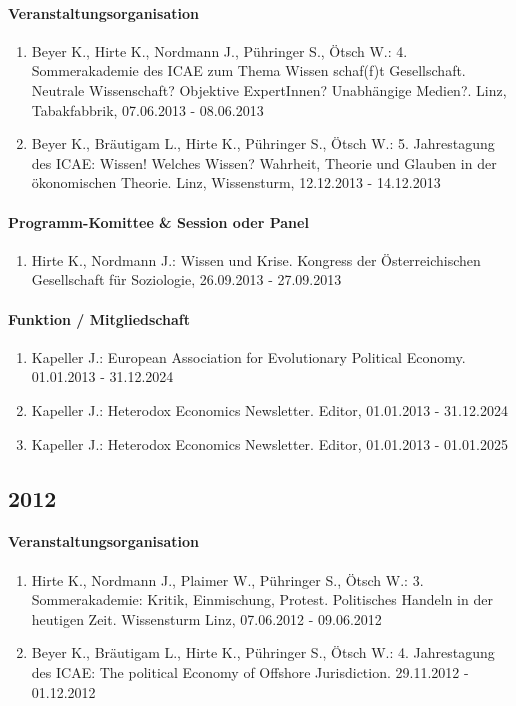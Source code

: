 \paragraph{Veranstaltungsorganisation}
\begin{enumerate}[leftmargin=*, labelsep=0.5cm]
\item Beyer K., Hirte K., Nordmann J., Pühringer S., Ötsch W.: 4. Sommerakademie des ICAE zum Thema  	  Wissen schaf(f)t Gesellschaft. Neutrale Wissenschaft? Objektive ExpertInnen? Unabhängige Medien?. Linz, Tabakfabbrik, 07.06.2013 - 08.06.2013
\item Beyer K., Bräutigam L., Hirte K., Pühringer S., Ötsch W.: 5. Jahrestagung des ICAE: Wissen! Welches Wissen? Wahrheit, Theorie und Glauben in der ökonomischen Theorie. Linz, Wissensturm, 12.12.2013 - 14.12.2013
\end{enumerate}

\paragraph{Programm-Komittee \& Session oder Panel}
\begin{enumerate}[leftmargin=*, labelsep=0.5cm]
\item Hirte K., Nordmann J.: Wissen und Krise. Kongress der Österreichischen Gesellschaft für Soziologie, 26.09.2013 - 27.09.2013
\end{enumerate}

\paragraph{Funktion / Mitgliedschaft}
\begin{enumerate}[leftmargin=*, labelsep=0.5cm]
\item Kapeller J.: European Association for Evolutionary Political Economy. 01.01.2013 - 31.12.2024
\item Kapeller J.: Heterodox Economics Newsletter. Editor, 01.01.2013 - 31.12.2024
\item Kapeller J.: Heterodox Economics Newsletter. Editor, 01.01.2013 - 01.01.2025
\end{enumerate}
\subsection*{2012}
\paragraph{Veranstaltungsorganisation}
\begin{enumerate}[leftmargin=*, labelsep=0.5cm]
\item Hirte K., Nordmann J., Plaimer W., Pühringer S., Ötsch W.: 3. Sommerakademie: Kritik, Einmischung, Protest. Politisches Handeln in der heutigen Zeit. Wissensturm Linz, 07.06.2012 - 09.06.2012
\item Beyer K., Bräutigam L., Hirte K., Pühringer S., Ötsch W.: 4. Jahrestagung des ICAE: The political Economy of Offshore Jurisdiction. 29.11.2012 - 01.12.2012
\end{enumerate}
